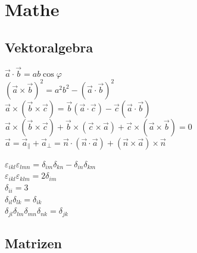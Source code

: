 \documentclass[12pt,a4paper]{article}
\renewcommand{\=}[1]{\stackrel{#1}{=}}
\theoremstyle{definition}
\theoremstyle{remark}
\begin{document}
\newpage
\appendix
{}

\section{Mathe}


\subsection{Vektoralgebra}

\begin{center}
\begin{minipage}[t]{.49\linewidth}
\vspace{0pt}
$\vec{a} \cdot \vec{b} = ab\cos\varphi$\\
$(\vec{a} \times \vec{b})^2 = a^2b^2 - (\vec{a} \cdot \vec{b})^2$\\
$\vec{a} \times (\vec{b} \times \vec{c}) = \vec{b}(\vec{a} \cdot \vec{c}) - \vec{c}(\vec{a} \cdot \vec{b})$\\
$\vec a \times (\vec b \times \vec c) + \vec b \times (\vec c \times \vec a) + \vec c \times (\vec a \times \vec b) = 0$\\
$\vec{a} = \vec{a}_{\parallel} + \vec{a}_{\perp} = \vec{n} \cdot (\vec{n} \cdot \vec{a}) + (\vec{n} \times \vec{a}) \times \vec{n}$\\
\end{minipage}%
\begin{minipage}[t]{.49\linewidth}
\vspace{0pt}
$\varepsilon_{ikl} \varepsilon_{lmn} = \delta_{im} \delta_{kn} - \delta_{in} \delta_{km}$\\
$\varepsilon_{ikl} \varepsilon_{klm} = 2 \delta_{im}$\\
$\delta_{ii} = 3$\\
$\delta_{il} \delta_{lk} = \delta_{ik}$\\
$\delta_{jl}\delta_{lm}\delta_{mn}\delta_{nk} = \delta_{jk}$\\
\end{minipage}
\end{center}


\subsection{Matrizen}
\end{document}
